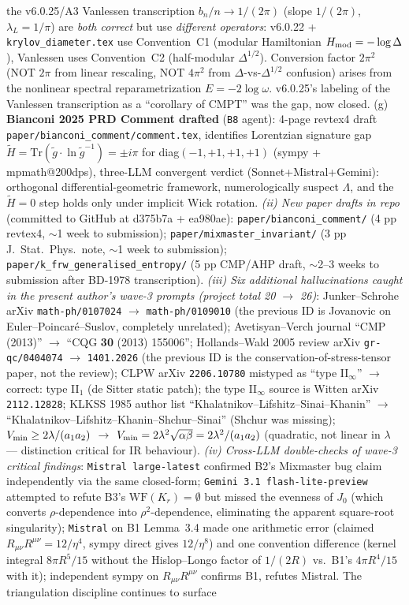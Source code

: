 \documentclass[reprint,amsmath,amssymb,aps,prd,superscriptaddress]{revtex4-2}
\providecommand{\1}{\mathbf{1}}
\begin{document}
the v6.0.25/A3 Vanlessen transcription $b_n/n \to 1/(2\pi)$ (slope $1/(2\pi)$, $\lambda_L = 1/\pi$) are \emph{both correct} but use \emph{different operators}: v6.0.22 + \texttt{krylov\_diameter.tex} use Convention~C1 (modular Hamiltonian $H_{\rm mod} = -\log\Delta$), Vanlessen uses Convention~C2 (half-modular $\Delta^{1/2}$). Conversion factor $2\pi^2$ (NOT $2\pi$ from linear rescaling, NOT $4\pi^2$ from $\Delta$-vs-$\Delta^{1/2}$ confusion) arises from the nonlinear spectral reparametrization $E = -2\log\omega$. v6.0.25's labeling of the Vanlessen transcription as a ``corollary of CMPT'' was the gap, now closed. (g) \textbf{Bianconi 2025 PRD Comment drafted} (\texttt{B8} agent): 4-page revtex4 draft \texttt{paper/bianconi\_comment/comment.tex}, identifies Lorentzian signature gap $\tilde H = \mathrm{Tr}(\tilde g \cdot \ln\tilde g^{-1}) = \pm i\pi$ for diag$(-1,+1,+1,+1)$ (sympy + mpmath@200dps), three-LLM convergent verdict (Sonnet+Mistral+Gemini): orthogonal differential-geometric framework, numerologically suspect $\Lambda$, and the $\tilde H = 0$ step holds only under implicit Wick rotation. \emph{(ii) New paper drafts in repo} (committed to GitHub at d375b7a + ea980ae): \texttt{paper/bianconi\_comment/} (4 pp revtex4, $\sim$1 week to submission); \texttt{paper/mixmaster\_invariant/} (3 pp J.~Stat.~Phys.\ note, $\sim$1 week to submission); \texttt{paper/k\_frw\_generalised\_entropy/} (5 pp CMP/AHP draft, $\sim$2--3 weeks to submission after BD-1978 transcription). \emph{(iii) Six additional hallucinations caught in the present author's wave-3 prompts (project total 20 $\to$ 26)}: Junker--Schrohe arXiv \texttt{math-ph/0107024} $\to$ \texttt{math-ph/0109010} (the previous ID is Jovanovic on Euler--Poincar\'e--Suslov, completely unrelated); Avetisyan--Verch journal ``CMP (2013)'' $\to$ ``CQG \textbf{30} (2013) 155006''; Hollands--Wald 2005 review arXiv \texttt{gr-qc/0404074} $\to$ \texttt{1401.2026} (the previous ID is the conservation-of-stress-tensor paper, not the review); CLPW arXiv \texttt{2206.10780} mistyped as ``type II$_\infty$'' $\to$ correct: type II$_1$ (de Sitter static patch); the type II$_\infty$ source is Witten arXiv \texttt{2112.12828}; KLKSS 1985 author list ``Khalatnikov--Lifshitz--Sinai--Khanin'' $\to$ ``Khalatnikov--Lifshitz--Khanin--Shchur--Sinai'' (Shchur was missing); $V_{\rm min} \geq 2\lambda/(a_1 a_2)$ $\to$ $V_{\rm min} = 2\lambda^2\sqrt{\alpha\beta} = 2\lambda^2/(a_1 a_2)$ (quadratic, not linear in $\lambda$ --- distinction critical for IR behaviour). \emph{(iv) Cross-LLM double-checks of wave-3 critical findings}: \texttt{Mistral large-latest} confirmed B2's Mixmaster bug claim independently via the same closed-form; \texttt{Gemini 3.1 flash-lite-preview} attempted to refute B3's $\mathrm{WF}(K_r)=\emptyset$ but missed the evenness of $J_0$ (which converts $\rho$-dependence into $\rho^2$-dependence, eliminating the apparent square-root singularity); \texttt{Mistral} on B1 Lemma~3.4 made one arithmetic error (claimed $R_{\mu\nu}R^{\mu\nu}=12/\eta^4$, sympy direct gives $12/\eta^8$) and one convention difference (kernel integral $8\pi R^5/15$ without the Hislop--Longo factor of $1/(2R)$ vs.\ B1's $4\pi R^4/15$ with it); independent sympy on $R_{\mu\nu}R^{\mu\nu}$ confirms B1, refutes Mistral. The triangulation discipline continues to surface 
\end{document}
